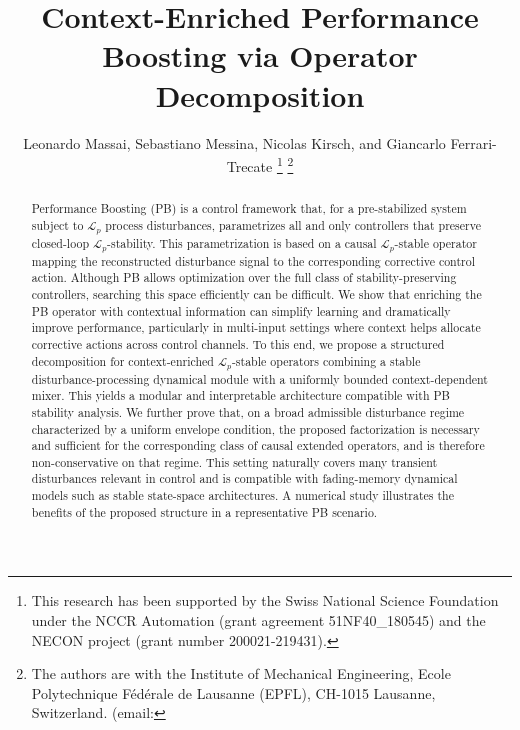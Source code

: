 \documentclass[journal,twoside,web]{ieeecolor}
\begin{document}
\title{\LARGE \bf Context-Enriched Performance Boosting via Operator Decomposition}


\author{Leonardo Massai, Sebastiano Messina, Nicolas Kirsch, and Giancarlo Ferrari-Trecate %
	\thanks{This research has been supported by the Swiss National Science Foundation under the NCCR Automation (grant agreement 51NF40\_180545) and the NECON project (grant number 200021-219431).}
    \thanks{The authors are with the Institute of Mechanical Engineering, Ecole Polytechnique Fédérale de Lausanne (EPFL), CH-1015 Lausanne, Switzerland. (email:}
}


\maketitle
\thispagestyle{empty}
 

\begin{abstract}
Performance Boosting (PB) is a control framework that, for a pre-stabilized system subject to \(\mathcal L_p\) process disturbances, parametrizes all and only controllers that preserve closed-loop \(\mathcal L_p\)-stability. This parametrization is based on a causal \(\mathcal L_p\)-stable operator mapping the reconstructed disturbance signal to the corresponding corrective control action. Although PB allows optimization over the full class of stability-preserving controllers, searching this space efficiently can be difficult. We show that enriching the PB operator with contextual information can simplify learning and dramatically improve performance, particularly in multi-input settings where context helps allocate corrective actions across control channels. To this end, we propose a structured decomposition for context-enriched \(\mathcal L_p\)-stable operators combining a stable disturbance-processing dynamical module with a uniformly bounded context-dependent mixer. This yields a modular and interpretable architecture compatible with PB stability analysis. We further prove that, on a broad admissible disturbance regime characterized by a uniform envelope condition, the proposed factorization is necessary and sufficient for the corresponding class of causal extended operators, and is therefore non-conservative on that regime. This setting naturally covers many transient disturbances relevant in control and is compatible with fading-memory dynamical models such as stable state-space architectures. A numerical study illustrates the benefits of the proposed structure in a representative PB scenario.
\end{abstract}
\end{document}

